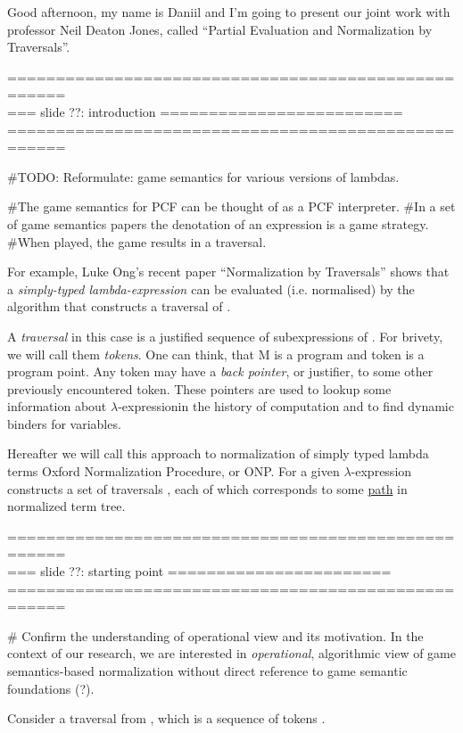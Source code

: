 \documentclass[a4paper, 10pt]{article} %
\newcommand{\red}[1]{{\color{red}#1}}
\newcommand{\green}[1]{{\color{blue!20!black!30!green}#1}}
\newcommand{\blue}[1]{{\color{blue}#1}}
\newcommand{\lam}[1]{{\color{brown}\textit{\boldmath{#1}}}}
\newcommand{\lexp}{$\lambda$-expression}
\begin{document}
Good afternoon, my name is Daniil and I'm going to present our joint work with 
professor Neil Deaton Jones, called ``Partial Evaluation and Normalization by 
Traversals''. 


====================================================\\
=== slide ??: introduction =========================\\
====================================================


\#TODO:
Reformulate: game semantics for various versions of lambdas.

\#The game semantics for PCF can be thought of as a PCF interpreter.
\#In a set of game semantics papers the denotation of an expression is a game strategy. 
\#When played, the game results in a traversal.

For example, Luke Ong’s recent paper ``Normalization by Traversals'' shows that a \blue{\textit{simply-typed 
lambda-expression \lam{M}}} can be \red{evaluated} (i.e. normalised) by the algorithm that 
constructs a \green{traversal} of \lam{M}.

A \green{\textit{traversal}} in this case is a justified sequence of subexpressions of \lam{M}.
For brivety, we will call them \green{\textit{tokens}}.  One can think, that M is 
a \blue{program} and token is a \blue{program point}. Any token may have a \green{\textit{back pointer}}, 
or justifier, to some other previously encountered token. These pointers are used to lookup some 
information about \lexp in the history of computation and to find dynamic binders for variables.

Hereafter we will call this approach to normalization of simply typed lambda terms Oxford Normalization Procedure, 
or ONP. For a given \lexp \lam{$M$} \lam{ONP} constructs a set of traversals \lam{$\mathfrak{Trav}(M)$}, each 
of which corresponds to some \underline{path} in normalized term tree.


====================================================\\
=== slide ??: starting point =======================\\
====================================================

\# Confirm the understanding of operational view and its motivation.
In the context of our research, we are interested in \emph{operational}, algorithmic 
view of game semantics-based normalization without direct reference to game semantic
foundations (?).

Consider a traversal \lam{$tr$} from \lam{$\mathfrak{Trav}(M)$}, which is a sequence of tokens \lam{$t_0$} \lam{$t_n$}.
\end{document}
